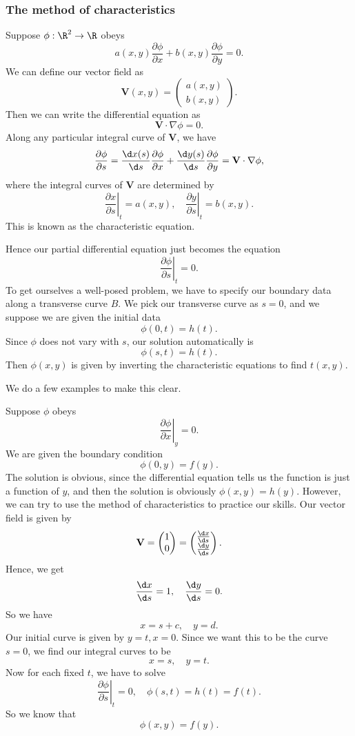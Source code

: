\documentclass[a4paper]{article}
\begin{document}
\subsubsection*{The method of characteristics}
Suppose $\phi: \R^2 \to \R$ obeys
\[
  a(x, y) \frac{\partial \phi}{\partial x} + b(x, y) \frac{\partial \phi}{\partial y} = 0.
\]
We can define our vector field as
\[
  \mathbf{V}(x, y) =
  \begin{pmatrix}
    a(x, y)\\
    b(x, y)
  \end{pmatrix}.
\]
Then we can write the differential equation as
\[
  \mathbf{V}\cdot \nabla \phi = 0.
\]
Along any particular integral curve of $\mathbf{V}$, we have
\[
  \frac{\partial \phi}{\partial s} = \frac{\d x(s)}{\d s} \frac{\partial \phi}{\partial x} + \frac{\d y(s)}{\d s} \frac{\partial \phi}{\partial y} = \mathbf{V}\cdot \nabla \phi,
\]
where the integral curves of $\mathbf{V}$ are determined by
\[
  \left.\frac{\partial x}{\partial s}\right|_t = a(x, y),\quad \left.\frac{\partial y}{\partial s}\right|_t = b(x, y).
\]
This is known as the characteristic equation.

Hence our partial differential equation just becomes the equation
\[
  \left.\frac{\partial \phi}{\partial s}\right|_t = 0.
\]
To get ourselves a well-posed problem, we have to specify our boundary data along a transverse curve $B$. We pick our transverse curve as $s = 0$, and we suppose we are given the initial data
\[
  \phi(0, t) = h(t).
\]
Since $\phi$ does not vary with $s$, our solution automatically is
\[
  \phi(s, t) = h(t).
\]
Then $\phi(x, y)$ is given by inverting the characteristic equations to find $t(x, y)$.

We do a few examples to make this clear.

\begin{eg}[Trivial]
  Suppose $\phi$ obeys
  \[
    \left.\frac{\partial \phi}{\partial x}\right|_y = 0.
  \]
  We are given the boundary condition
  \[
    \phi(0, y) = f(y).
  \]
  The solution is obvious, since the differential equation tells us the function is just a function of $y$, and then the solution is obviously $\phi(x, y) = h(y)$. However, we can try to use the method of characteristics to practice our skills. Our vector field is given by
  \[
    \mathbf{V} =
    \begin{pmatrix}
      1\\0
    \end{pmatrix}
    =
    \begin{pmatrix}
      \frac{\d x}{\d s}\\
      \frac{\d y}{\d s}
    \end{pmatrix}.
  \]
  Hence, we get
  \[
    \frac{\d x}{\d s} = 1,\quad \frac{\d y}{\d s} = 0.
  \]
  So we have
  \[
    x = s + c,\quad y = d.
  \]
  Our initial curve is given by $y = t, x = 0$. Since we want this to be the curve $s = 0$, we find our integral curves to be
  \[
    x = s,\quad y = t.
  \]
  Now for each fixed $t$, we have to solve
  \[
    \left.\frac{\partial \phi}{\partial s}\right|_t = 0,\quad \phi(s, t) = h(t) = f(t).
  \]
  So we know that
  \[
    \phi(x, y) = f(y).
  \]
\end{eg}
\end{document}
